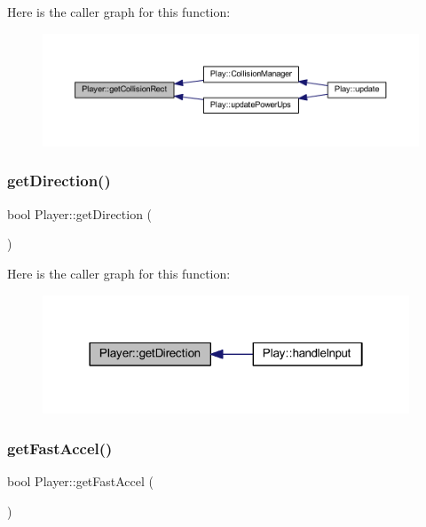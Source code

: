 Here is the caller graph for this function\+:
\nopagebreak
\begin{figure}[H]
\begin{center}
\leavevmode
\includegraphics[width=350pt]{class_player_ab23a6224f848e8b8fab134c355b8a8de_icgraph}
\end{center}
\end{figure}
\mbox{\label{class_player_a55ab1bb46619242418ef5c7d104efe23}} 
\subsubsection{\texorpdfstring{get\+Direction()}{getDirection()}}
{\footnotesize\ttfamily bool Player\+::get\+Direction (\begin{DoxyParamCaption}{ }\end{DoxyParamCaption})}

Here is the caller graph for this function\+:
\nopagebreak
\begin{figure}[H]
\begin{center}
\leavevmode
\includegraphics[width=310pt]{class_player_a55ab1bb46619242418ef5c7d104efe23_icgraph}
\end{center}
\end{figure}
\mbox{\label{class_player_a8ee193bc4d7773b6a1114e1b312f7eac}} 
\subsubsection{\texorpdfstring{get\+Fast\+Accel()}{getFastAccel()}}
{\footnotesize\ttfamily bool Player\+::get\+Fast\+Accel (\begin{DoxyParamCaption}{ }\end{DoxyParamCaption})}

